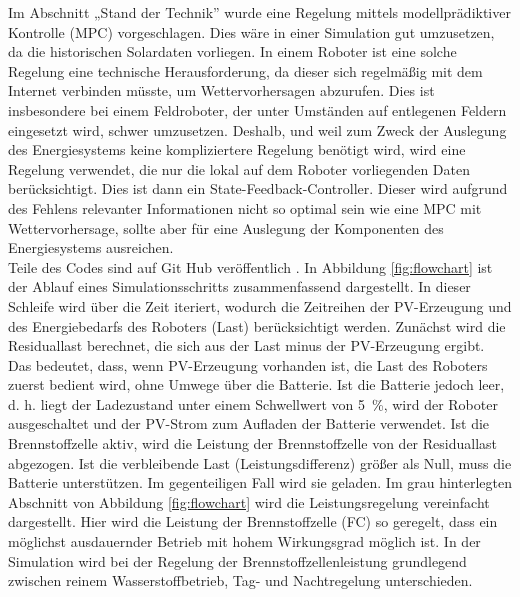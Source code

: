 Im Abschnitt „Stand der Technik” wurde eine Regelung mittels modellprädiktiver Kontrolle (MPC) vorgeschlagen. Dies wäre in einer Simulation gut umzusetzen, da die historischen Solardaten vorliegen. In einem Roboter ist eine solche Regelung eine technische Herausforderung, da dieser sich regelmäßig mit dem Internet verbinden müsste, um Wettervorhersagen abzurufen. Dies ist insbesondere bei einem Feldroboter, der unter Umständen auf entlegenen Feldern eingesetzt wird, schwer umzusetzen. Deshalb, und weil zum Zweck der Auslegung des Energiesystems keine kompliziertere Regelung benötigt wird, wird eine Regelung verwendet, die nur die lokal auf dem Roboter vorliegenden Daten berücksichtigt. Dies ist dann ein State-Feedback-Controller. Dieser wird aufgrund des Fehlens relevanter Informationen nicht so optimal sein wie eine MPC mit Wettervorhersage, sollte aber für eine Auslegung der Komponenten des Energiesystems ausreichen. \\


Teile des Codes sind auf Git Hub veröffentlich \cite{friedrich2026_hybrid_energy}. In Abbildung \ref{fig:flowchart} ist der Ablauf eines Simulationsschritts zusammenfassend dargestellt. In dieser Schleife wird über die Zeit iteriert, wodurch die Zeitreihen der PV-Erzeugung und des Energiebedarfs des Roboters (Last) berücksichtigt werden. Zunächst wird die Residuallast berechnet, die sich aus der Last minus der PV-Erzeugung ergibt. Das bedeutet, dass, wenn PV-Erzeugung vorhanden ist, die Last des Roboters zuerst bedient wird, ohne Umwege über die Batterie. Ist die Batterie jedoch leer, d. h. liegt der Ladezustand unter einem Schwellwert von 5~\%, wird der Roboter ausgeschaltet und der PV-Strom zum Aufladen der Batterie verwendet. Ist die Brennstoffzelle aktiv, wird die Leistung der Brennstoffzelle von der Residuallast abgezogen. Ist die verbleibende Last (Leistungsdifferenz) größer als Null, muss die Batterie unterstützen. Im gegenteiligen Fall wird sie geladen. Im grau hinterlegten Abschnitt von Abbildung \ref{fig:flowchart} wird die Leistungsregelung vereinfacht dargestellt. Hier wird die Leistung der Brennstoffzelle (FC) so geregelt, dass ein möglichst ausdauernder Betrieb mit hohem Wirkungsgrad möglich ist. In der Simulation wird bei der Regelung der Brennstoffzellenleistung grundlegend zwischen reinem Wasserstoffbetrieb, Tag- und Nachtregelung unterschieden. 

